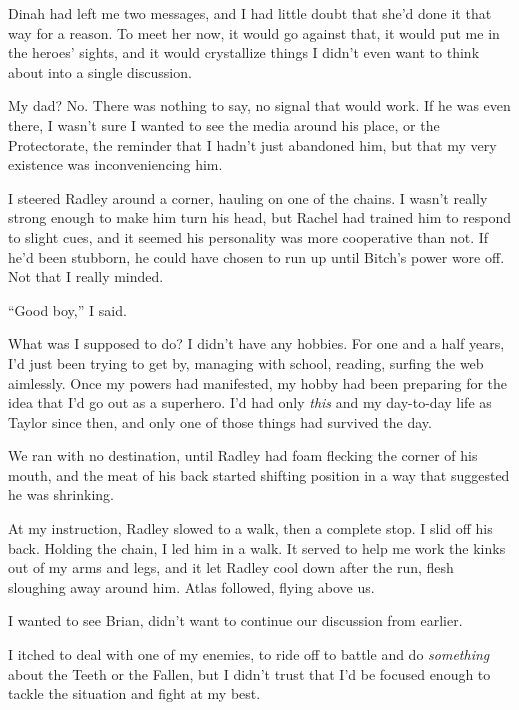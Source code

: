 Dinah had left me two messages, and I had little doubt that she'd done it that way for a reason.  To meet her now, it would go against that, it would put me in the heroes' sights,  and it would crystallize things I didn't even want to think about into a single discussion.



My dad?  No.  There was nothing to say, no signal that would work.  If he was even there, I wasn't sure I wanted to see the media around his place, or the Protectorate, the reminder that I hadn't just abandoned him, but that my very existence was inconveniencing him.



I steered Radley around a corner, hauling on one of the chains.  I wasn't really strong enough to make him turn his head, but Rachel had trained him to respond to slight cues, and it seemed his personality was more cooperative than not.  If he'd been stubborn, he could have chosen to run up until Bitch's power wore off.  Not that I really minded.



``Good boy,'' I said.



What was I supposed to do?  I didn't have any hobbies.  For one and a half years, I'd just been trying to get by, managing with school, reading, surfing the web aimlessly.  Once my powers had manifested, my hobby had been preparing for the idea that I'd go out as a superhero.  I'd had only \emph{this} and my day-to-day life as Taylor since then, and only one of those things had survived the day.



We ran with no destination, until Radley had foam flecking the corner of his mouth, and the meat of his back started shifting position in a way that suggested he was shrinking.



At my instruction, Radley slowed to a walk, then a complete stop.  I slid off his back.  Holding the chain, I led him in a walk.  It served to help me work the kinks out of my arms and legs, and it let Radley cool down after the run, flesh sloughing away around him.  Atlas followed, flying above us.



I wanted to see Brian, didn't want to continue our discussion from earlier.



I itched to deal with one of my enemies, to ride off to battle and do \emph{something} about the Teeth or the Fallen, but I didn't trust that I'd be focused enough to tackle the situation and fight at my best.



